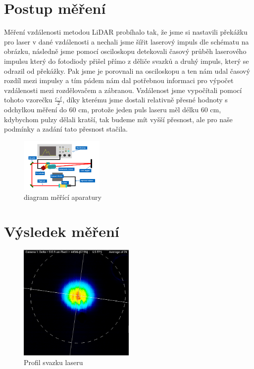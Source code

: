 \documentclass[12pt,a4paper]{article}
\begin{document}
\section{Postup měření}
Měření vzdálenosti metodou LiDAR probíhalo tak, že jsme si nastavili překážku pro laser v dané vzdálenosti a nechali jsme šířit laserový impuls dle schématu na obrázku, následně jsme pomocí osciloskopu detekovali časový průběh laserového impulsu který do fotodiody přišel přímo z děliče svazků a druhý impuls, který se odrazil od překážky. Pak jsme je porovnali na osciloskopu a ten nám udal časový rozdíl mezi impulsy a tím pádem nám dal potřebnou informaci pro výpočet vzdálenosti mezi rozdělovačem a zábranou. Vzdálenost jsme vypočítali pomocí tohoto vzorečku $\frac{c \cdot t}{2}$, díky kterému jsme dostali relativně přesné hodnoty s odchylkou měření do 60 cm, protože jeden puls laseru měl délku 60 cm, kdybychom pulzy dělali kratší, tak budeme mít vyšší přesnost, ale pro naše podmínky a zadání tato přesnost stačila.
\begin{figure}[h]
    \centering
    \includegraphics[width=0.36\textwidth]{Diagram měření.png}
    \caption{diagram měřící aparatury}
\end{figure}
\pagebreak
\section{Výsledek měření}
    
\begin{figure}[h!]
    \centering
    \includegraphics[width=0.5\textwidth]{profil.png}
    \caption{Profil svazku laseru}
\end{figure}
\end{document}
